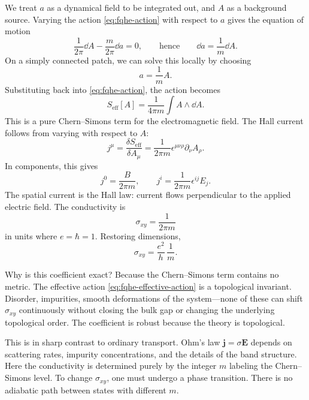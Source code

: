 We treat $a$ as a dynamical field to be integrated out, and $A$ as a background source. Varying the action \eqref{eq:fqhe-action} with respect to $a$ gives the equation of motion
\begin{equation}
  \frac{1}{2\pi}\dd A-\frac{m}{2\pi}\dd a=0,
  \qquad\text{hence}\qquad
  \dd a=\frac{1}{m}\dd A.
  \label{eq:fqhe-eom}
\end{equation}
On a simply connected patch, we can solve this locally by choosing
\begin{equation}
  a = \frac{1}{m}A.
  \label{eq:fqhe-solution}
\end{equation}
Substituting back into \eqref{eq:fqhe-action}, the action becomes
\begin{equation}
  S_{\mathrm{eff}}[A]
  =
  \frac{1}{4\pi m}\int A\wedge\dd A.
  \label{eq:fqhe-effective-action}
\end{equation}
This is a pure Chern--Simons term for the electromagnetic field. The Hall current follows from varying with respect to $A$:
\begin{equation}
  j^\mu
  =
  \frac{\delta S_{\mathrm{eff}}}{\delta A_\mu}
  =
  \frac{1}{2\pi m}\epsilon^{\mu\nu\rho}\partial_\nu A_\rho.
  \label{eq:fqhe-current}
\end{equation}
In components, this gives
\begin{equation}
  j^0=\frac{B}{2\pi m},
  \qquad
  j^i=\frac{1}{2\pi m}\epsilon^{ij}E_j.
  \label{eq:fqhe-density-hall}
\end{equation}
The spatial current is the Hall law: current flows perpendicular to the applied electric field. The conductivity is
\begin{equation}
  \sigma_{xy}=\frac{1}{2\pi m}
  \label{eq:fqhe-conductance-derived}
\end{equation}
in units where $e=\hbar=1$. Restoring dimensions,
\begin{equation}
  \sigma_{xy}=\frac{e^2}{h}\,\frac{1}{m}.
  \label{eq:fqhe-conductance-physical}
\end{equation}

Why is this coefficient exact? Because the Chern--Simons term contains no metric. The effective action \eqref{eq:fqhe-effective-action} is a topological invariant. Disorder, impurities, smooth deformations of the system---none of these can shift $\sigma_{xy}$ continuously without closing the bulk gap or changing the underlying topological order. The coefficient is robust because the theory is topological.

This is in sharp contrast to ordinary transport. Ohm's law $\mathbf{j}=\sigma\mathbf{E}$ depends on scattering rates, impurity concentrations, and the details of the band structure. Here the conductivity is determined purely by the integer $m$ labeling the Chern--Simons level. To change $\sigma_{xy}$, one must undergo a phase transition. There is no adiabatic path between states with different $m$.

